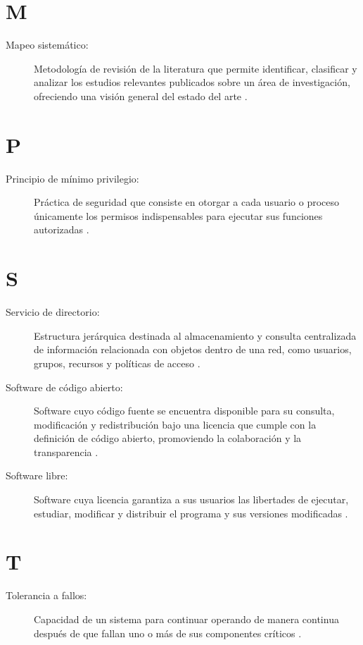 \section*{M}
\begin{description}
	\item[Mapeo sistemático:] Metodología de revisión de la literatura que permite identificar, clasificar y analizar los estudios relevantes publicados sobre un área de investigación, ofreciendo una visión general del estado del arte \citep{Petersen2015}.
\end{description}

\section*{P}
\begin{description}
	\item[Principio de mínimo privilegio:] Práctica de seguridad que consiste en otorgar a cada usuario o proceso únicamente los permisos indispensables para ejecutar sus funciones autorizadas \citep{OWASP2026}.
\end{description}

\section*{S}
\begin{description}
	\item[Servicio de directorio:] Estructura jerárquica destinada al almacenamiento y consulta centralizada de información relacionada con objetos dentro de una red, como usuarios, grupos, recursos y políticas de acceso \citep{Microsoft2025}.
	\item[Software de código abierto:] Software cuyo código fuente se encuentra disponible para su consulta, modificación y redistribución bajo una licencia que cumple con la definición de código abierto, promoviendo la colaboración y la transparencia \citep{OSI2026}.
	\item[Software libre:] Software cuya licencia garantiza a sus usuarios las libertades de ejecutar, estudiar, modificar y distribuir el programa y sus versiones modificadas \citep{FSF2026}.
\end{description}

\section*{T}
\begin{description}
	\item[Tolerancia a fallos:] Capacidad de un sistema para continuar operando de manera continua después de que fallan uno o más de sus componentes críticos \citep{IBM2026}.
\end{description}
